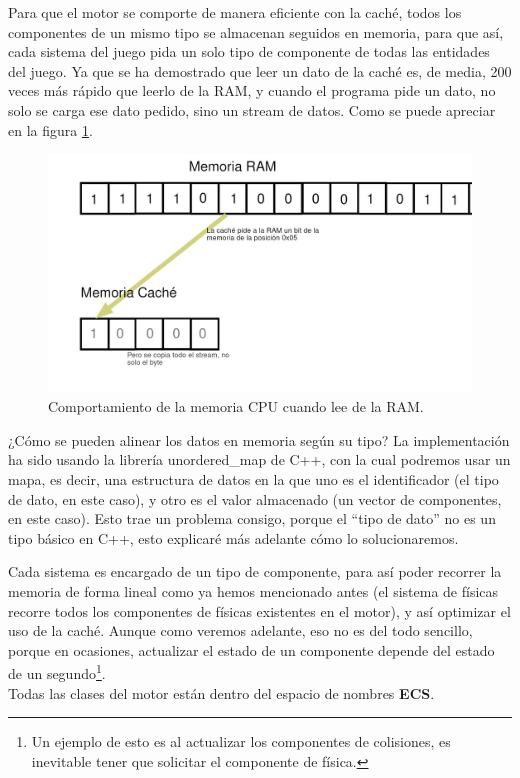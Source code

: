 Para que el motor se comporte de manera eficiente con la caché, todos los componentes de un mismo tipo se almacenan seguidos en memoria, para que así, cada sistema del juego pida un solo tipo de componente de todas las entidades del juego. Ya que se ha demostrado que leer un dato de la caché es, de media, 200 veces más rápido que leerlo de la RAM, y cuando el programa pide un dato, no solo se carga ese dato pedido, sino un stream de datos. Como se puede apreciar en la figura \ref{Memoria RAM y CPU}.
\begin{figure}[h]
	\centering
	\includegraphics[width=15cm]{archivos/imagenes/comportamiento-memoria-cpu-ram.png}
	\caption{Comportamiento de la memoria CPU cuando lee de la RAM.}
	\label{Memoria RAM y CPU}
\end{figure}

¿Cómo se pueden alinear los datos en memoria según su tipo? La implementación ha sido usando la librería unordered\_map de C++, con la cual podremos usar un mapa, es decir, una estructura de datos en la que uno es el identificador (el tipo de dato, en este caso), y otro es el valor almacenado (un vector de componentes, en este caso).  Esto trae un problema consigo, porque el ``tipo de dato'' no es un tipo básico en C++, esto explicaré más adelante cómo lo solucionaremos. 

Cada sistema es encargado de un tipo de componente, para así poder recorrer la memoria de forma lineal como ya hemos mencionado antes (el sistema de físicas recorre todos los componentes de físicas existentes en el motor), y así optimizar el uso de la caché. Aunque como veremos adelante, eso no es del todo sencillo, porque en ocasiones, actualizar el estado de un componente depende del estado de un segundo\footnote{Un ejemplo de esto es al actualizar los componentes de colisiones, es inevitable tener que solicitar el componente de física.}.
\\
Todas las clases del motor están dentro del espacio de nombres \textbf{ECS}.

